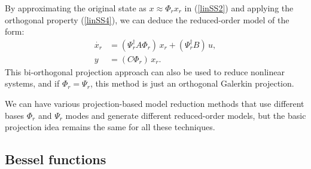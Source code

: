 \documentclass[12pt,lot, lof]{puthesis}
\begin{document}
By approximating the original state as $x \approx \Phi_r x_r$ in (\ref{linSS2}) and applying the orthogonal property (\ref{linSS4}), we can deduce the reduced-order model of the form:
\begin{equation}
\label{linSS5}
\begin{aligned}
	\dot{x_r}&= \left(\Psi_r^{\dagger} A \Phi_r \right) \,x_r  + \left( \Psi_r^{\dagger} B \right) \, u,   \\
	y &= \left( C  \Phi_r \right) \,x_r.
\end{aligned}
\end{equation}
This bi-orthogonal projection approach can also be used to reduce nonlinear systems, and if $\Phi_r = \Psi_r $, this method is just an orthogonal Galerkin projection. 

We can have various projection-based model reduction methods that use different bases $\Phi_r$ and $\Psi_r$ modes and generate different reduced-order models, but the basic projection idea remains the same for all these techniques.  


\subsection{Bessel functions}
\label{Besselmeth}
\end{document}
